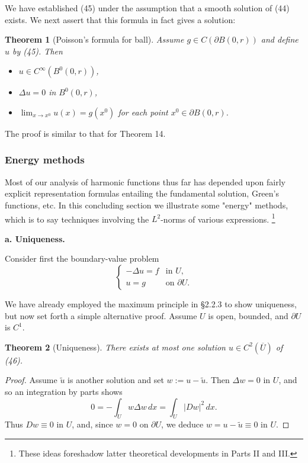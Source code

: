 \documentclass[a4paper,12pt]{report}
\newtheorem{theorem}{Theorem}[section]
\begin{document}
We have established (45) under the assumption that a smooth solution of (44) exists. We next assert that this formula in fact gives a solution:
\begin{theorem}[Poisson's formula for ball]
Assume \( g \in C(\partial B(0, r)) \) and define \( u \) by (45). Then
\begin{itemize}
    \item[(i)] \( u \in C^\infty(B^0(0, r)) \),
    \item[(ii)] \( \Delta u = 0 \) in \( B^0(0, r) \),
    \item[(iii)] \( \lim_{x \to x^0} u(x) = g(x^0) \) for each point \( x^0 \in \partial B(0, r) \).
\end{itemize}
\end{theorem}

The proof is similar to that for Theorem 14.

\noindent
\subsubsection{Energy methods}
Most of our analysis of harmonic functions thus far has depended upon fairly explicit representation formulas entailing the fundamental solution, Green's functions, etc. In this concluding section we illustrate some "energy" methods, which is to say techniques involving the \( L^2 \)-norms of various expressions. \footnote{These ideas foreshadow latter theoretical developments in Parts II and III.}

\noindent
\textbf{a. Uniqueness.}

Consider first the boundary-value problem
\[
\begin{cases}
-\Delta u = f & \text{in } U, \\
u = g & \text{on } \partial U.
\end{cases}
\tag{46}
\]

We have already employed the maximum principle in §2.2.3 to show uniqueness, but now set forth a simple alternative proof. Assume \( U \) is open, bounded, and \( \partial U \) is \( C^1 \).
\begin{theorem}[Uniqueness]
There exists at most one solution \( u \in C^2(\overline{U}) \) of (46).
\end{theorem}
\begin{proof}
Assume \( \tilde{u} \) is another solution and set \( w := u - \tilde{u} \). Then \( \Delta w = 0 \) in \( U \), and so an integration by parts shows
\[
0 = - \int_U w \Delta w \, dx = \int_U |Dw|^2 \, dx.
\]
Thus \( Dw \equiv 0 \) in \( U \), and, since \( w = 0 \) on \( \partial U \), we deduce \( w = u - \tilde{u} \equiv 0 \) in \( U \).
\end{proof}
\end{document}
